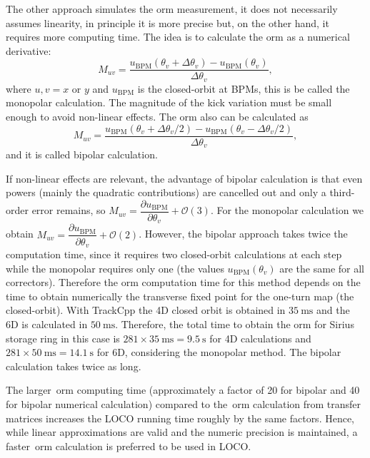 The other approach simulates the \gls{orm} measurement, it does not necessarily assumes linearity, in principle it is more precise but, on the other hand, it requires more computing time. The idea is to calculate the \gls{orm} as a numerical derivative:
\begin{equation}
    M_{uv} = \dfrac{u_{\mathrm{BPM}}\left(\theta_v + \Delta \theta_v\right)-u_{\mathrm{BPM}}\left(\theta_v \right)}{\Delta \theta_v},
    \label{eq:unipolar_respm}
\end{equation}
where $u, v = x$ or $y$ and $u_{\mathrm{BPM}}$ is the closed-orbit at BPMs, this is be called the monopolar calculation. The magnitude of the kick variation must be small enough to avoid non-linear effects. The \gls{orm} also can be calculated as
\begin{equation}
    M_{uv} = \dfrac{u_{\mathrm{BPM}}\left(\theta_v + \Delta \theta_v/2\right)-u_{\mathrm{BPM}}\left(\theta_v- \Delta \theta_v/2\right)}{\Delta \theta_v},
    \label{eq:bipolar_respm}
\end{equation}
and it is called bipolar calculation.

If non-linear effects are relevant, the advantage of bipolar calculation is that even powers (mainly the quadratic contributions) are cancelled out and only a third-order error remains, so $M_{uv} = \dfrac{\partial u_{\mathrm{BPM}}}{\partial \theta_v} + \mathcal{O}(3)$. For the monopolar calculation we obtain $M_{uv} = \dfrac{\partial u_{\mathrm{BPM}}}{\partial \theta_v} + \mathcal{O}(2)$. However, the bipolar approach takes twice the computation time, since it requires two closed-orbit calculations at each step while the monopolar requires only one (the values $u_{\mathrm{BPM}}\left(\theta_v \right)$ are the same for all correctors). Therefore the \gls{orm} computation time for this method depends on the time to obtain numerically the transverse fixed point for the one-turn map (the closed-orbit). With TrackCpp the 4D closed orbit is obtained in $\SI{35}{\milli\second}$ and the 6D is calculated in $\SI{50}{\milli\second}$. Therefore, the total time to obtain the \gls{orm} for Sirius storage ring in this case is $281 \times \SI{35}{\milli\second} = \SI{9.5}{\second}$ for 4D calculations and $281 \times \SI{50}{\milli\second} = \SI{14.1}{\second}$ for 6D, considering the monopolar method. The bipolar calculation takes twice as long.

The larger~\gls{orm} computing time (approximately a factor of 20 for bipolar and 40 for bipolar numerical calculation) compared to the~\gls{orm} calculation from transfer matrices increases the LOCO running time roughly by the same factors. Hence, while linear approximations are valid and the numeric precision is maintained, a faster~\gls{orm} calculation is preferred to be used in LOCO.

